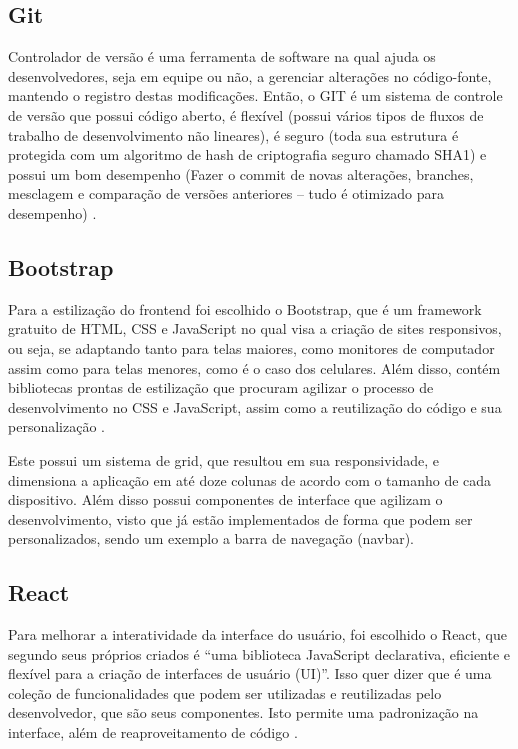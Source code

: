 \subsection{Git}
Controlador de versão é uma ferramenta de software na qual ajuda os desenvolvedores, seja em equipe ou não, a gerenciar alterações no código-fonte, mantendo o registro destas modificações. Então, o GIT é um sistema de controle de versão que possui código aberto, é flexível (possui vários tipos de fluxos de trabalho de desenvolvimento não lineares), é seguro (toda sua estrutura é protegida com um algoritmo de hash de criptografia seguro chamado SHA1) e possui um bom desempenho (Fazer o commit de novas alterações, branches, mesclagem e comparação de versões anteriores – tudo é otimizado para desempenho) \cite{SANTACROCE}.

\subsection{Bootstrap}
Para a estilização do frontend foi escolhido o Bootstrap, que é um framework gratuito de HTML, CSS e JavaScript no qual visa a criação de sites responsivos, ou seja, se adaptando tanto para telas maiores, como monitores de computador assim como para telas menores, como é o caso dos celulares. Além disso, contém bibliotecas prontas de estilização que procuram agilizar o processo de desenvolvimento no CSS e JavaScript, assim como a reutilização do código e sua personalização \cite{SPURLOCK}.

Este possui um sistema de grid, que resultou em sua responsividade, e dimensiona a aplicação em até doze colunas de acordo com o tamanho de cada dispositivo. Além disso possui componentes de interface que agilizam o desenvolvimento, visto que já estão implementados de forma que podem ser personalizados, sendo um exemplo a barra de navegação (navbar).

\subsection{React}
Para melhorar a interatividade da interface do usuário, foi escolhido o React, que segundo seus próprios criados é “uma biblioteca JavaScript declarativa, eficiente e flexível para a criação de interfaces de usuário (UI)”. Isso quer dizer que é uma coleção de funcionalidades que podem ser utilizadas e reutilizadas pelo desenvolvedor, que são seus componentes. Isto permite uma padronização na interface, além de reaproveitamento de código \cite{ZAMMETTI}.

